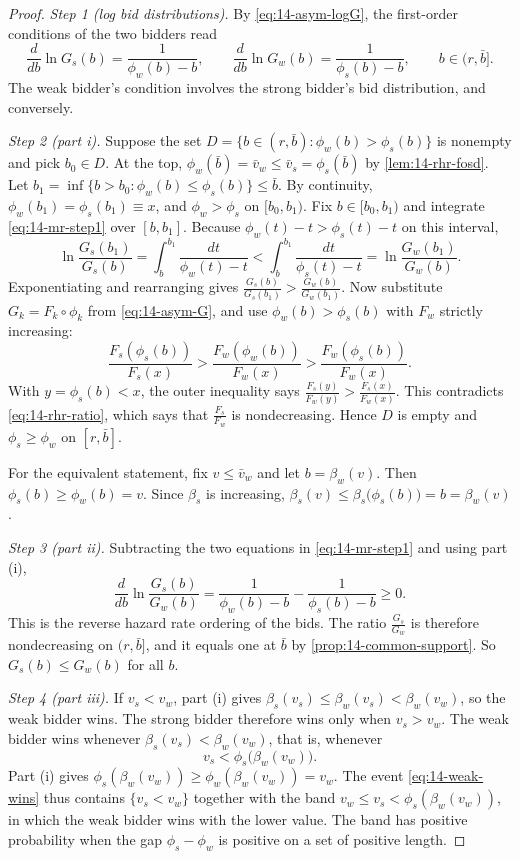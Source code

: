 \begin{proof}
\emph{Step 1 (log bid distributions).} By \eqref{eq:14-asym-logG}, the first-order conditions of the
two bidders read
\begin{equation}\label{eq:14-mr-step1}
\frac{d}{db}\ln G_s(b)=\frac{1}{\phi_w(b)-b},\qquad \frac{d}{db}\ln G_w(b)=\frac{1}{\phi_s(b)-b},
\qquad b\in(r,\bar b].
\end{equation}
The weak bidder's condition involves the strong bidder's bid distribution, and conversely.

\emph{Step 2 (part i).} Suppose the set $D=\{b\in(r,\bar b):\phi_w(b)>\phi_s(b)\}$ is nonempty and
pick $b_0\in D$. At the top, $\phi_w(\bar b)=\bar v_w\le\bar v_s=\phi_s(\bar b)$ by
\cref{lem:14-rhr-fosd}. Let $b_1=\inf\{b>b_0:\phi_w(b)\le\phi_s(b)\}\le\bar b$. By continuity,
$\phi_w(b_1)=\phi_s(b_1)\equiv x$, and $\phi_w>\phi_s$ on $[b_0,b_1)$. Fix $b\in[b_0,b_1)$ and
integrate \eqref{eq:14-mr-step1} over $[b,b_1]$. Because $\phi_w(t)-t>\phi_s(t)-t$ on this interval,
\[
\ln\frac{G_s(b_1)}{G_s(b)}=\int_b^{b_1}\frac{dt}{\phi_w(t)-t}<\int_b^{b_1}\frac{dt}{\phi_s(t)-t}
=\ln\frac{G_w(b_1)}{G_w(b)} .
\]
Exponentiating and rearranging gives $\frac{G_s(b)}{G_s(b_1)}>\frac{G_w(b)}{G_w(b_1)}$. Now substitute
$G_k=F_k\circ\phi_k$ from \eqref{eq:14-asym-G}, and use $\phi_w(b)>\phi_s(b)$ with $F_w$ strictly
increasing:
\[
\frac{F_s(\phi_s(b))}{F_s(x)}>\frac{F_w(\phi_w(b))}{F_w(x)}>\frac{F_w(\phi_s(b))}{F_w(x)} .
\]
With $y=\phi_s(b)<x$, the outer inequality says $\frac{F_s(y)}{F_w(y)}>\frac{F_s(x)}{F_w(x)}$. This
contradicts \eqref{eq:14-rhr-ratio}, which says that $\frac{F_s}{F_w}$ is nondecreasing. Hence $D$ is
empty and $\phi_s\ge\phi_w$ on $[r,\bar b]$.

For the equivalent statement, fix $v\le\bar v_w$ and let $b=\beta_w(v)$. Then
$\phi_s(b)\ge\phi_w(b)=v$. Since $\beta_s$ is increasing,
$\beta_s(v)\le\beta_s\bigl(\phi_s(b)\bigr)=b=\beta_w(v)$.

\emph{Step 3 (part ii).} Subtracting the two equations in \eqref{eq:14-mr-step1} and using part (i),
\[
\frac{d}{db}\ln\frac{G_s(b)}{G_w(b)}=\frac{1}{\phi_w(b)-b}-\frac{1}{\phi_s(b)-b}\ge 0 .
\]
This is the reverse hazard rate ordering of the bids. The ratio $\frac{G_s}{G_w}$ is therefore
nondecreasing on $(r,\bar b]$, and it equals one at $\bar b$ by \cref{prop:14-common-support}. So
$G_s(b)\le G_w(b)$ for all $b$.

\emph{Step 4 (part iii).} If $v_s<v_w$, part (i) gives $\beta_s(v_s)\le\beta_w(v_s)<\beta_w(v_w)$, so
the weak bidder wins. The strong bidder therefore wins only when $v_s>v_w$. The weak bidder wins
whenever $\beta_s(v_s)<\beta_w(v_w)$, that is, whenever
\begin{equation}\label{eq:14-weak-wins}
v_s<\phi_s\bigl(\beta_w(v_w)\bigr).
\end{equation}
Part (i) gives $\phi_s(\beta_w(v_w))\ge\phi_w(\beta_w(v_w))=v_w$. The event \eqref{eq:14-weak-wins}
thus contains $\{v_s<v_w\}$ together with the band $v_w\le v_s<\phi_s(\beta_w(v_w))$, in which the
weak bidder wins with the lower value. The band has positive probability when the gap
$\phi_s-\phi_w$ is positive on a set of positive length.


\end{proof}
